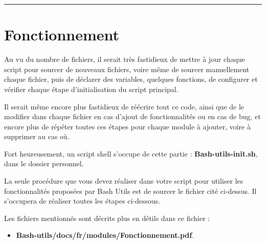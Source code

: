 \documentclass[a4paper,10pt]{article}
\begin{document}



\color{red}\par\noindent\rule{\textwidth}{0.4pt}\color{white}

\color{red}
\section{Fonctionnement}\color{white}

\begin{justify}
    Au vu du nombre de fichiers, il serait très fastidieux de mettre à jour chaque script pour sourcer de nouveaux fichiers, voire même de sourcer manuellement chaque fichier, puis de déclarer des variables, quelques fonctions, de configurer et vérifier chaque étape d'initialisation du script principal.
\end{justify}

\begin{justify}
    Il serait même encore plus fastidieux de réécrire tout ce code, ainsi que de le modifier dans chaque fichier en cas d'ajout de fonctionnalités ou en cas de bug, et encore plus de répéter toutes ces étapes pour chaque module à ajouter, voire à supprimer au cas où.
\end{justify}

\begin{justify}
    Fort heureusement, un script shell s'occupe de cette partie : \textbf{\color{lime}Bash-utils-init.sh}, dans le dossier personnel.
\end{justify}

\begin{justify}
    La seule procédure que vous devez réaliser dans votre script pour utiliser les fonctionnalités proposées par Bash Utils est de sourcer le fichier cité ci-dessus. Il s'occupera de réaliser toutes les étapes ci-dessous.
\end{justify}

\begin{justify}
    Les fichiers mentionnés sont décrits plus en détils dans ce fichier :

    \begin{itemize}
        \item \textbf{\color{lime}Bash-utils/docs/fr/modules/Fonctionnement.pdf}.
    \end{itemize}
\end{justify}
\end{document}
